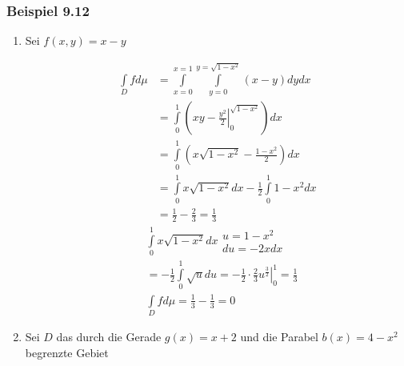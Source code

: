 \subsubsection*{Beispiel 9.12}
\begin{enumerate}
\item Sei $f\left( x,y\right)=x-y$

\begin{center}
\end{center}

\begin{align*}
\int\limits_D fd\mu &=\int\limits_{x=0}^{x=1}\int\limits_{y=0}^{y=\sqrt{1-x^2}}\left( x-y\right) dy dx\\
 &=\int\limits_0^1 {\left( {\left. {xy - \frac{{{y^2}}}{2}} \right|_0^{\sqrt {1 - {x^2}} }} \right)} dx\\
&=\int\limits_0^1 {\left( {x\sqrt {1 - {x^2}}  - \frac{{1 - {x^2}}}{2}} \right)dx}\\
&=\int\limits_0^1 {x\sqrt {1 - {x^2}} } dx - \frac{1}{2}\int\limits_0^1 {1 - {x^2}dx}\\
 &=\frac{1}{2} - \frac{2}{3} = \frac{1}{3}
\end{align*}
\begin{align*}
&\int\limits_0^1 {x\sqrt {1 - {x^2}} dx} \begin{array}{*{20}{c}}
{u = 1 - {x^2}}\\
{du =  - 2xdx}
\end{array}\\
&=  - \frac{1}{2}\int\limits_0^1 {\sqrt u du}  = \left. { - \frac{1}{2} \cdot \frac{2}{3}{u^{\frac{3}{2}}}} \right|_0^1 = \frac{1}{3}\\
&\int\limits_D {fd\mu  = \frac{1}{3} - \frac{1}{3} = 0}
\end{align*}
\item Sei $D$  das durch die Gerade $g(x)=x+2$ und die Parabel $b(x)=4-x^2$ begrenzte Gebiet


\end{enumerate}
